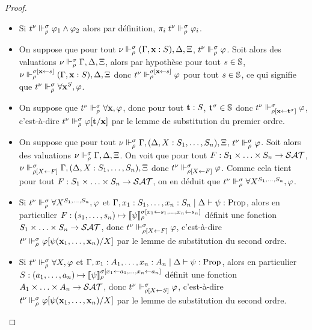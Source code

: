 \documentclass{article}
\begin{document}
\begin{proof}
\begin{itemize}
  \item Si $t^\nu \Vdash_\rho^\sigma \varphi_1\land\varphi_2$ alors par définition, $\pi_i\;t^\nu\Vdash_\rho^\sigma \varphi_i$.
  \item On suppose que pour tout $\nu\Vdash_\rho^\sigma (\Gamma, \mathbf{x} : S), \Delta,\Xi$, $t^\nu\Vdash_\rho^\sigma \varphi$. Soit alors des valuations $\nu\Vdash_\rho^\sigma \Gamma,\Delta,\Xi$, alors par hypothèse pour tout $s \in \mathbb{S}$, $\nu\Vdash_\rho^{\sigma[\mathbf{x}\leftarrow s]}(\Gamma, \mathbf{x} : S), \Delta, \Xi$ donc $t^\nu\Vdash_\rho^{\sigma[\mathbf{x} \leftarrow s]}\varphi$ pour tout $s\in \mathbb{S}$, ce qui signifie que $t^\nu \Vdash_\rho^\sigma \forall \mathbf{x}^S, \varphi$.
  \item On suppose que $t^\nu\Vdash_\rho^\sigma \forall \mathbf{x}, \varphi$, donc pour tout $\mathbf{t} : S$, $\mathbf{t}^\sigma \in \mathbb S$ donc $t^\nu\Vdash_{\rho[\mathbf{x}\leftarrow \mathbf{t}^\sigma]}^\sigma \varphi$, c'est-à-dire $t^\nu\Vdash_\rho^\sigma \varphi[\mathbf{t}/\mathbf{x}]$ par le lemme de substitution du premier ordre.
  \item On suppose que pour tout $\nu\Vdash_\rho^\sigma \Gamma, (\Delta, X : S_1,\ldots,S_n), \Xi$, $t^\nu \Vdash_\rho^\sigma \varphi$. Soit alors des valuations $\nu\Vdash_\rho^\sigma\Gamma, \Delta,\Xi$. On voit que pour tout $F : S_1\times\ldots\times S_n \to \mathcal {SAT}$, $\nu\Vdash_{\rho[X\leftarrow F]}^\sigma \Gamma, (\Delta, X : S_1,\ldots,S_n),\Xi$ donc $t^\nu\Vdash_{\rho[X\leftarrow F]}^\sigma \varphi$. Comme cela tient pour tout $F : S_1\times\ldots\times S_n \to \mathcal {SAT}$, on en déduit que $t^\nu\Vdash_\rho^\sigma \forall X^{S_1,\ldots,S_n}, \varphi$.
  \item Si $t^\nu\Vdash_\rho^\sigma \forall X^{S_1,\ldots,S_n}, \varphi$ et $\Gamma,x_1 : S_1,\ldots,x_n : S_n\mid\Delta\vdash \psi : \mathrm{Prop}$, alors en particulier $F : (s_1,\ldots,s_n) \mapsto \llbracket \psi \rrbracket_\rho^{\sigma[x_1\leftarrow s_1,\ldots, x_n \leftarrow s_n]}$ définit une fonction $S_1\times\ldots\times S_n \to\mathcal {SAT}$, donc $t^\nu\Vdash_{\rho[X\leftarrow F]}^\sigma \varphi$, c'est-à-dire $t^\nu\Vdash_\rho^\sigma \varphi[\psi(\mathbf{x}_1,\ldots,\mathbf{x}_n)/X]$ par le lemme de substitution du second ordre.
  \item Si $t^\nu\Vdash_\rho^\sigma \forall X, \varphi$ et $\Gamma,x_1 : A_1,\ldots,x_n : A_n\mid\Delta\vdash \psi : \mathrm{Prop}$, alors en particulier $S : (a_1,\ldots,a_n) \mapsto \llbracket \psi \rrbracket_\rho^{\sigma[x_1\leftarrow a_1,\ldots, x_n \leftarrow a_n]}$ définit une fonction $A_1\times\ldots\times A_n \to\mathcal {SAT}$, donc $t^\nu\Vdash_{\rho[X\leftarrow S]}^\sigma \varphi$, c'est-à-dire $t^\nu\Vdash_\rho^\sigma \varphi[\psi(\mathbf{x}_1,\ldots,\mathbf{x}_n)/X]$ par le lemme de substitution du second ordre.

\end{itemize}
\end{proof}
\end{document}
